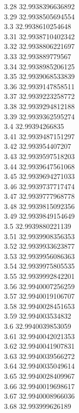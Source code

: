 {3.28	32.9938396636892\\
3.29	32.9938505694554\\
3.3	32.9938610254648\\
3.31	32.9938710402342\\
3.32	32.9938806221697\\
3.33	32.993889779567\\
3.34	32.9938985206125\\
3.35	32.9939068533839\\
3.36	32.9939147858511\\
3.37	32.9939223258772\\
3.38	32.9939294812188\\
3.39	32.9939362595274\\
3.4	32.99394266835\\
3.41	32.9939487151297\\
3.42	32.993954407207\\
3.43	32.9939597518203\\
3.44	32.9939647561068\\
3.45	32.9939694271033\\
3.46	32.9939737717474\\
3.47	32.9939777968778\\
3.48	32.9939815092356\\
3.49	32.9939849154649\\
3.5	32.9939880221139\\
3.51	32.9939908356353\\
3.52	32.9939933623877\\
3.53	32.9939956086363\\
3.54	32.9939975805535\\
3.55	32.9939992842201\\
3.56	32.9940007256259\\
3.57	32.9940019106707\\
3.58	32.9940028451653\\
3.59	32.994003534832\\
3.6	32.9940039853059\\
3.61	32.9940042021353\\
3.62	32.9940041907831\\
3.63	32.9940039566272\\
3.64	32.9940035049614\\
3.65	32.9940028409967\\
3.66	32.9940019698617\\
3.67	32.9940008966036\\
3.68	32.993999626189\\
}
